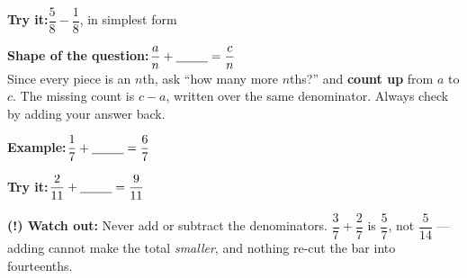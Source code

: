\documentclass[12pt]{article}
\begin{document}
\begin{tryitbox}
\textbf{Try it:}\quad $\dfrac{5}{8} - \dfrac{1}{8}$, in simplest form\\[2pt]
\end{tryitbox}


\begin{formulabox}
\textbf{Shape of the question:}\quad $\dfrac{a}{n} + \underline{\hspace{0.9cm}} = \dfrac{c}{n}$\\[3pt]
Since every piece is an $n$th, ask ``how many more $n$ths?'' and \textbf{count up}
from $a$ to $c$. The missing count is $c - a$, written over the same denominator.
Always check by adding your answer back.
\end{formulabox}

\begin{examplebox}
\textbf{Example:}\quad $\dfrac{1}{7} + \underline{\hspace{0.9cm}} = \dfrac{6}{7}$
\end{examplebox}

\begin{tryitbox}
\textbf{Try it:}\quad $\dfrac{2}{11} + \underline{\hspace{0.9cm}} = \dfrac{9}{11}$\\[2pt]
\end{tryitbox}

\begin{watchoutbox}
\textbf{(!) Watch out:} Never add or subtract the denominators.
$\dfrac{3}{7} + \dfrac{2}{7}$ is $\dfrac{5}{7}$, not $\dfrac{5}{14}$ --- adding cannot
make the total \emph{smaller}, and nothing re-cut the bar into fourteenths.
\end{watchoutbox}
\end{document}
